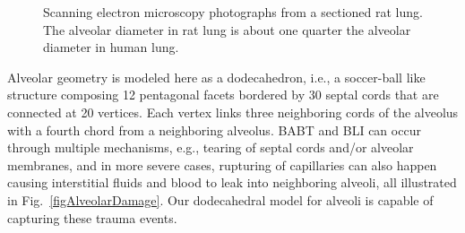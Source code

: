 \begin{figure}
    \centering
    \hfill
    \caption{Scanning electron microscopy photographs from a sectioned rat lung.  The alveolar diameter in rat lung is about one quarter the alveolar diameter in human lung.}
    \label{figRatLung}
\end{figure}

Alveolar geometry is modeled here as a dodecahedron, i.e., a soccer-ball like structure composing 12 pentagonal facets bordered by 30 septal cords that are connected at 20 vertices.  Each vertex links three neighboring cords of the alveolus with a fourth chord from a neighboring alveolus.  BABT and BLI can occur through multiple mechanisms, e.g., tearing of septal cords and\slash or alveolar membranes, and in more severe cases, rupturing of capillaries can also happen causing interstitial fluids and blood to leak into neighboring alveoli, all illustrated in Fig.~\ref{figAlveolarDamage}.  Our dodecahedral model for alveoli is capable of capturing these trauma events.

